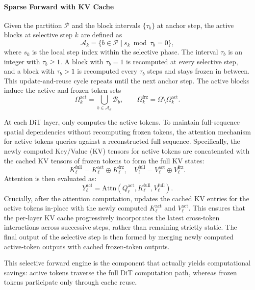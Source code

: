 \paragraph{Sparse Forward with KV Cache} Given the partition $\mathcal{P}$ and the block intervals $\{\tau_b\}$ at anchor step, the active blocks at selective step $k$ are defined as
\begin{equation}
    \mathcal{A}_k = \{ b \in \mathcal{P} \mid s_k \bmod \tau_b = 0 \},
\end{equation}
where $s_k$ is the local step index within the selective phase. The interval $\tau_b$ is an integer with $\tau_b \ge 1$. A block with $\tau_b = 1$ is recomputed at every selective step, and a block with $\tau_b > 1$ is recomputed every $\tau_b$ steps and stays frozen in between. This update-and-reuse cycle repeats until the next anchor step. The active blocks induce the active and frozen token sets
\begin{equation}
    \Omega_k^{\mathrm{act}} = \bigcup_{b \in \mathcal{A}_k} \mathcal{B}_b,
    \qquad
    \Omega_k^{\mathrm{frz}} = \Omega \setminus \Omega_k^{\mathrm{act}}.
\end{equation}

At each DiT layer, \cubic only computes the active tokens. To maintain full-sequence spatial dependencies without recomputing frozen tokens, the attention mechanism for active tokens queries against a reconstructed full sequence. Specifically, the newly computed Key/Value (KV) tensors for active tokens are concatenated with the cached KV tensors of frozen tokens to form the full KV states:
\begin{equation}
    K_\ell^{\mathrm{full}} = K_\ell^{\mathrm{act}} \oplus K_\ell^{\mathrm{frz}}, \quad
    V_\ell^{\mathrm{full}} = V_\ell^{\mathrm{act}} \oplus V_\ell^{\mathrm{frz}}.
\end{equation}
Attention is then evaluated as:
\begin{equation}
    Y_\ell^{\mathrm{act}} =
    \mathrm{Attn}\!\left(
    Q_\ell^{\mathrm{act}},
    K_\ell^{\mathrm{full}},
    V_\ell^{\mathrm{full}}
    \right).
\end{equation}
Crucially, after the attention computation, \cubic updates the cached KV entries for the active tokens in-place with the newly computed $K_\ell^{\mathrm{act}}$ and $V_\ell^{\mathrm{act}}$. This ensures that the per-layer KV cache progressively incorporates the latest cross-token interactions across successive steps, rather than remaining strictly static. The final output of the selective step is then formed by merging newly computed active-token outputs with cached frozen-token outputs.

This selective forward engine is the component that actually yields computational savings: active tokens traverse the full DiT computation path, whereas frozen tokens participate only through cache reuse.

